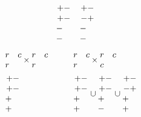 \documentclass[11pt ,reqno]{amsart}
\begin{document}
\begin{example}
$$\begin{aligned}
&&\begin{matrix} +-\\+-\\-\quad\\-\quad\end{matrix}
&&\begin{matrix} +-\\-+\\-\quad\\-\quad\end{matrix}
\end{aligned}
$$
$$
\begin{aligned}
&\begin{matrix} r&c\\ r\end{matrix}\times\begin{matrix}  r&c\\ r\end{matrix}\qquad
&&\begin{matrix} r&c\\ r\end{matrix}\times\begin{matrix} r&c\\ c\end{matrix}\qquad\\
&\begin{matrix} +-\\+-\\+\quad\\+\quad\end{matrix}
&&\begin{matrix} +-\\+-\\+\quad\\+\quad\end{matrix}\cup\begin{matrix}+-\\+-\\+\quad\\-\quad\end{matrix}\cup
\begin{matrix}+-\\-+\\+\quad\\+\quad\end{matrix}
\end{aligned}
$$
\end{example}
\end{document}

